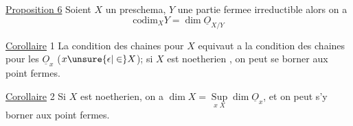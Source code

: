 \uline{Proposition 6} \quad Soient $X$ un preschema, $Y$ une partie fermee irreductible
alors on a
\[
\mathrm{codim}_X Y=\dim\underline O_{X/Y}
\]

\uline{Corollaire} 1 \quad La condition des chaines pour $X$ equivaut a la condition
des chaines pour les $\underline O_x$ ($x\unsure{\epsilon|\in}X$); si $X$ est noetherien , on peut se
borner aux point fermes.

\uline{Corollaire} 2 \quad Si $X$ est noetherien, on a $\dim X=\mathop{\mathrm{Sup}}\limits_{x\;X}\dim\underline O_x$, et
on peut s'y borner aux point fermes.
